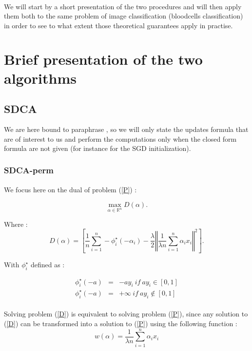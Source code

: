 \documentclass[10pt,a4paper]{article}
\begin{document}
\paragraph{}
We will start by a short presentation of the two procedures and will then apply them both to the same problem of image classification (bloodcells classification) in order to see to what extent those theoretical guarantees apply in practise.


\section{Brief presentation of the two algorithms}

\subsection{SDCA}

We are here bound to paraphrase \cite{1}, so we will only state the updates formula that are of interest to us and perform the computations only when the closed form formula are not given (for instance for the SGD initialization).

\subsubsection{SDCA-perm}

\paragraph{}
We focus here on the dual of problem (\ref{P}) : 

\begin{equation}\label{D}
\max_{\alpha \in \mathbb{R}^n} D(\alpha).
\end{equation}

Where : 
$$D(\alpha) = \left [ \frac{1}{n} \sum_{i=1}^n - \phi_i^{\star} (-\alpha_i) - \frac{\lambda}{2} \left \Vert \frac{1}{\lambda n} \sum_{i=1}^n \alpha_i x_i\right \Vert ^2 \right ].$$

With $ \phi_i^{\star}$ defined as : 

\begin{eqnarray*}
\phi_i^{\star} (-a) &=& -ay_i ~if~ ay_i \in [0, 1]\\
\phi_i^{\star} (-a) &=& + \infty ~if~ ay_i \notin [0, 1]
\end{eqnarray*}

\paragraph{}
Solving problem (\ref{D}) is equivalent to solving problem (\ref{P}), since any solution to (\ref{D}) can be transformed into a solution to (\ref{P}) using the following function \cite{1} : 
$$ w(\alpha) = \frac{1}{\lambda n} \sum_{i=1}^n \alpha_i x_i$$
\end{document}
